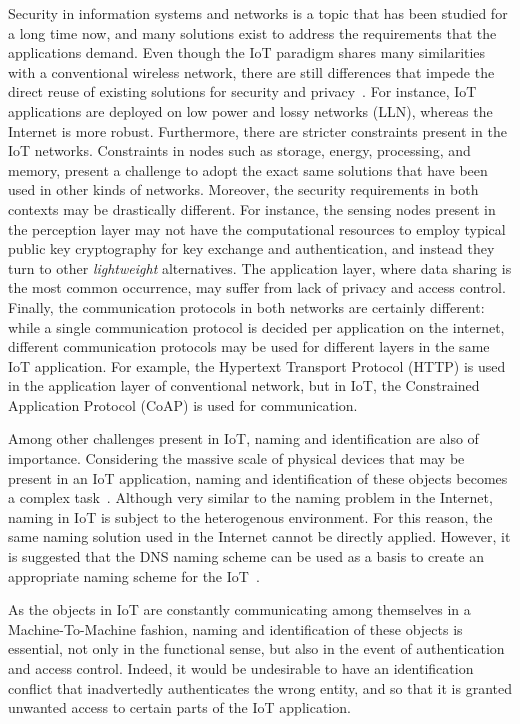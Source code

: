 \documentclass[12pt]{article}
\begin{document}
Security in information systems and networks is a topic that has been studied for a long time now, and many solutions exist to address the requirements that the applications demand. Even though the IoT paradigm shares many similarities with a conventional wireless network, there are still differences that impede the direct reuse of existing solutions for security and privacy~\cite{ALABA201710}. For instance, IoT applications are deployed on low power and lossy networks (LLN), whereas the Internet is more robust. Furthermore, there are stricter constraints present in the IoT networks. Constraints in nodes such as storage, energy, processing, and memory, present a challenge to adopt the exact same solutions that have been used in other kinds of networks. Moreover, the security requirements in both contexts may be drastically different. For instance, the sensing nodes present in the perception layer may not have the computational resources to employ typical public key cryptography for key exchange and authentication, and instead they turn to other \emph{lightweight} alternatives. The application layer, where data sharing is the most common occurrence, may suffer from lack of privacy and access control. Finally, the communication protocols in both networks are certainly different: while a single communication protocol is decided per application on the internet, different communication protocols may be used for different layers in the same IoT application. For example, the Hypertext Transport Protocol (HTTP) is used in the application layer of conventional network, but in IoT, the Constrained Application Protocol (CoAP) is used for communication.

Among other challenges present in IoT, naming and identification are also of importance. Considering the massive scale of physical devices that may be present in an IoT application, naming and identification of these objects becomes a complex task~\cite{Zhang:2015}. Although very similar to the naming problem in the Internet, naming in IoT is subject to the heterogenous environment. For this reason, the same naming solution used in the Internet cannot be directly applied. However, it is suggested that the DNS naming scheme can be used as a basis to create an appropriate naming scheme for the IoT~\cite{Zhang:2015}. 

As the objects in IoT are constantly communicating among themselves in a Machine-To-Machine fashion, naming and identification of these objects is essential, not only in the functional sense, but also in the event of authentication and access control. Indeed, it would be undesirable to have an identification conflict that inadvertedly authenticates the wrong entity, and so that it is granted unwanted access to certain parts of the IoT application.
\end{document}
